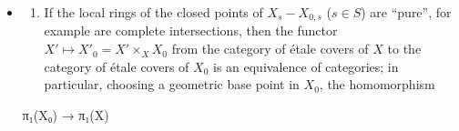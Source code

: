 \documentclass[
  11pt,
  a4paper,
]{book}
\newenvironment{Shaded}{}{}
\newcommand{\NormalTok}[1]{#1}
\providecommand{\tightlist}{%
  \setlength{\itemsep}{0pt}\setlength{\parskip}{0pt}}
\begin{document}
\begin{itemize}
\item
  \begin{enumerate}
  \def\labelenumi{\alph{enumi})}
  \tightlist
  \item
    If the local rings of the closed points of \(X_{s} - X_{0,s}\)
    (\(s \in S\)) are ``pure'', for example are complete intersections,
    then the functor \(X' \mapsto X'_{0} = X' \times_{X} X_{0}\) from
    the category of étale covers of \(X\) to the category of étale
    covers of \(X_{0}\) is an equivalence of categories; in particular,
    choosing a geometric base point in \(X_{0}\), the homomorphism
  \end{enumerate}

\begin{Shaded}
\begin{Highlighting}[]
\NormalTok{π₁(X₀) → π₁(X)}
\end{Highlighting}
\end{Shaded}


\end{itemize}
\end{document}
